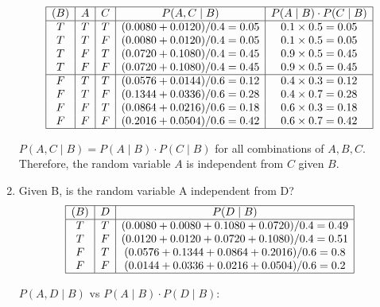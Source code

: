 \documentclass[12pt]{article}
\begin{document}
\begin{enumerate}[font=\Large,label=(\alph*)]
	      $$
		      \begin{array}{|c|c|c|c|c|}
			      \hline
			      (B) & A & C & P(A, C \mid B)           & P(A \mid B) \cdot P(C \mid B) \\
			      \hline
			      T   & T & T & (0.0080+0.0120)/0.4=0.05 & 0.1 \times 0.5 = 0.05         \\
			      T   & T & F & (0.0080+0.0120)/0.4=0.05 & 0.1 \times 0.5 = 0.05         \\
			      T   & F & T & (0.0720+0.1080)/0.4=0.45 & 0.9 \times 0.5 = 0.45         \\
			      T   & F & F & (0.0720+0.1080)/0.4=0.45 & 0.9 \times 0.5 = 0.45         \\
			      \hline
			      F   & T & T & (0.0576+0.0144)/0.6=0.12 & 0.4 \times 0.3 = 0.12         \\
			      F   & T & F & (0.1344+0.0336)/0.6=0.28 & 0.4 \times 0.7 = 0.28         \\
			      F   & F & T & (0.0864+0.0216)/0.6=0.18 & 0.6 \times 0.3 = 0.18         \\
			      F   & F & F & (0.2016+0.0504)/0.6=0.42 & 0.6 \times 0.7 = 0.42         \\
			      \hline
		      \end{array}
	      $$

	      $P(A, C \mid B) = P(A \mid B) \cdot P(C \mid B)$ for all combinations of $A,B,C$. Therefore, the random variable $A$ is independent from $C$ given $B$.

	\item Given B, is the random variable A independent from D?
	      $$
		      \begin{array}{|c|c|c|}
			      \hline
			      (B) & D & P(D \mid B)                                  \\
			      \hline
			      T   & T & (0.0080 + 0.0080 + 0.1080 + 0.0720)/0.4=0.49 \\
			      T   & F & (0.0120 + 0.0120 + 0.0720 + 0.1080)/0.4=0.51 \\
			      F   & T & (0.0576 + 0.1344 + 0.0864 + 0.2016)/0.6=0.8  \\
			      F   & F & (0.0144 + 0.0336 + 0.0216 + 0.0504)/0.6=0.2  \\
			      \hline
		      \end{array}
	      $$

	      $P(A, D \mid B)$ vs $P(A \mid B) \cdot P(D \mid B):$


\end{enumerate}
\end{document}
